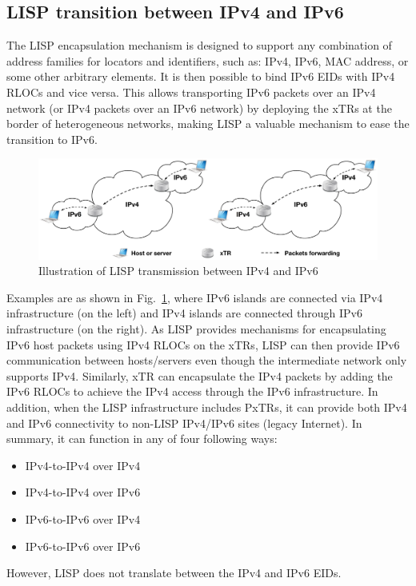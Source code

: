 \subsection{LISP transition between IPv4 and IPv6}
\label{subsubsec:transmission}
The LISP encapsulation mechanism is designed to support any combination of address families for locators and identifiers, such as: IPv4, IPv6, MAC address, or some other arbitrary elements. It is then possible to bind IPv6 EIDs with IPv4 RLOCs and vice versa. This allows transporting IPv6 packets over an IPv4 network (or IPv4 packets over an IPv6 network) by deploying the xTRs at the border of heterogeneous networks, making LISP a valuable mechanism to ease the transition to IPv6.
\begin{figure}[!t]
	\centering
	\includegraphics[width=\textwidth]{Pics/transmission_ipv4_ipv6.eps}
	\caption{Illustration of LISP transmission between IPv4 and IPv6}
	\label{transmission_ipv4_ipv6}
\end{figure}

Examples are as shown in Fig.~\ref{transmission_ipv4_ipv6}, where IPv6 islands are connected via IPv4 infrastructure (on the left) and IPv4 islands are connected through IPv6 infrastructure (on the right). As LISP provides mechanisms for encapsulating IPv6 host packets using IPv4 RLOCs on the xTRs, LISP can then provide IPv6 communication between hosts/servers even though the intermediate network only supports IPv4. Similarly, xTR can encapsulate the IPv4 packets by adding the IPv6 RLOCs to achieve the IPv4 access through the IPv6 infrastructure. In addition, when the LISP infrastructure includes PxTRs, it can provide both IPv4 and IPv6 connectivity to non-LISP IPv4/IPv6 sites (legacy Internet). In summary, it can function in any of four following ways:
\begin{itemize}[noitemsep,topsep=0pt]
	\item IPv4-to-IPv4 over IPv4
	\item IPv4-to-IPv4 over IPv6
	\item IPv6-to-IPv6 over IPv4
	\item IPv6-to-IPv6 over IPv6
\end{itemize}
However, LISP does not translate between the IPv4 and IPv6 EIDs.

